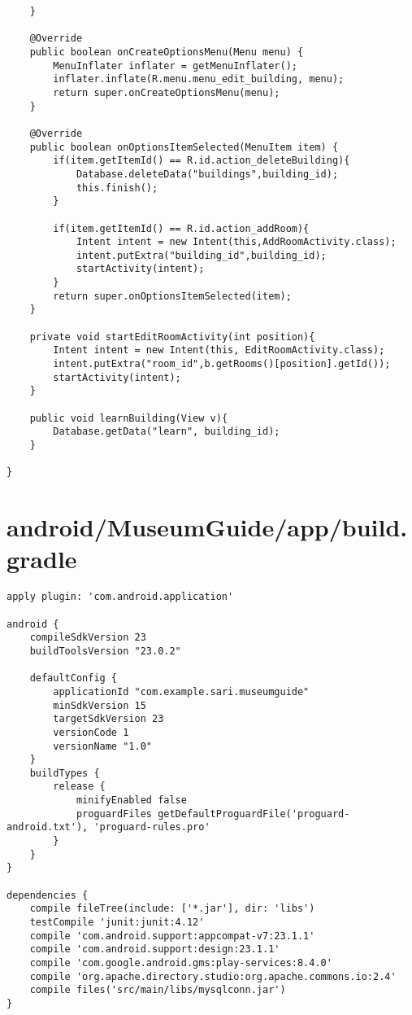 \begin{lstlisting}
    }

    @Override
    public boolean onCreateOptionsMenu(Menu menu) {
        MenuInflater inflater = getMenuInflater();
        inflater.inflate(R.menu.menu_edit_building, menu);
        return super.onCreateOptionsMenu(menu);
    }

    @Override
    public boolean onOptionsItemSelected(MenuItem item) {
        if(item.getItemId() == R.id.action_deleteBuilding){
            Database.deleteData("buildings",building_id);
            this.finish();
        }

        if(item.getItemId() == R.id.action_addRoom){
            Intent intent = new Intent(this,AddRoomActivity.class);
            intent.putExtra("building_id",building_id);
            startActivity(intent);
        }
        return super.onOptionsItemSelected(item);
    }

    private void startEditRoomActivity(int position){
        Intent intent = new Intent(this, EditRoomActivity.class);
        intent.putExtra("room_id",b.getRooms()[position].getId());
        startActivity(intent);
    }

    public void learnBuilding(View v){
        Database.getData("learn", building_id);
    }

}
\end{lstlisting}
\newpage
\section{android/MuseumGuide/app/build.gradle}
\begin{lstlisting}apply plugin: 'com.android.application'

android {
    compileSdkVersion 23
    buildToolsVersion "23.0.2"

    defaultConfig {
        applicationId "com.example.sari.museumguide"
        minSdkVersion 15
        targetSdkVersion 23
        versionCode 1
        versionName "1.0"
    }
    buildTypes {
        release {
            minifyEnabled false
            proguardFiles getDefaultProguardFile('proguard-android.txt'), 'proguard-rules.pro'
        }
    }
}

dependencies {
    compile fileTree(include: ['*.jar'], dir: 'libs')
    testCompile 'junit:junit:4.12'
    compile 'com.android.support:appcompat-v7:23.1.1'
    compile 'com.android.support:design:23.1.1'
    compile 'com.google.android.gms:play-services:8.4.0'
    compile 'org.apache.directory.studio:org.apache.commons.io:2.4'
    compile files('src/main/libs/mysqlconn.jar')
}
\end{lstlisting}
\newpage
